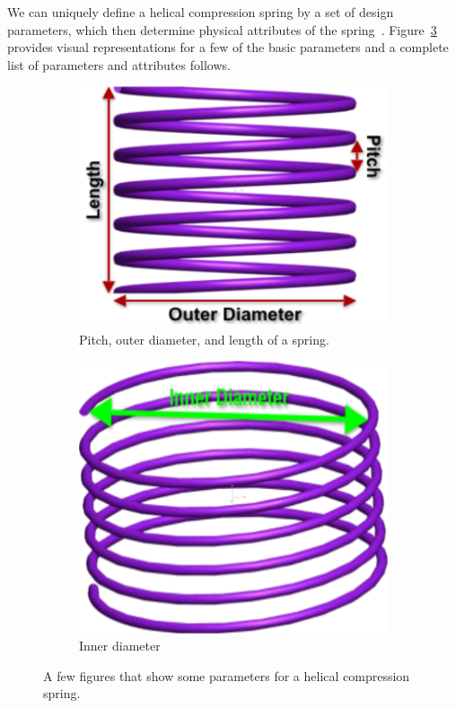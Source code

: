 \documentclass[10pt]{article}
\begin{document}
We can uniquely define a helical compression spring by a set of design parameters, which then determine physical attributes of the spring~\cite{Massad2015}. Figure~\ref{fig:Descriptions} provides visual representations for a few of the basic parameters and a complete list of parameters and attributes follows. 		 
		\begin{figure}[h]
			\centering
			\begin{subfigure}{.5\textwidth}
				\includegraphics[scale=.2]{Spring_Description.png}
				\caption{Pitch, outer diameter, and length of a spring.}
				\label{fig:Description1}
			\end{subfigure}%
			\begin{subfigure}{.5\textwidth}
				  \centering
		 		\includegraphics[scale=.2]{Spring_Description2.png}
				\caption{Inner diameter}
				  \label{fig:Description2}
		  		
			\end{subfigure}
			 \label{fig:Descriptions}
		  \caption{A few figures that show some parameters for a helical compression spring.}
		\end{figure}
		
\end{document}
